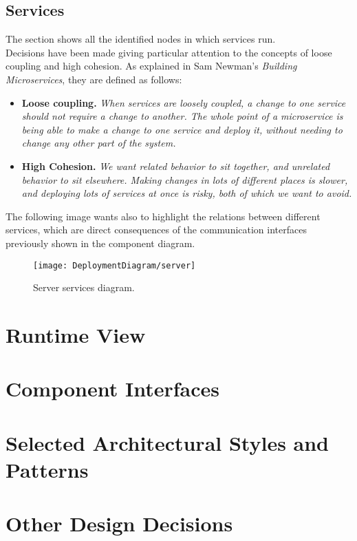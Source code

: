 \subsection{Services}
\label{subsec:services}%
The section shows all the identified nodes in which services run. \\
Decisions have been made giving particular attention to the concepts of loose coupling and high cohesion.
As explained in Sam Newman's \textit{Building Microservices}, they are defined as follows:
\begin{itemize}
    \item \textbf{Loose coupling.} \textit{When services are loosely coupled, a change to one service should not require a change to another.
    The whole point of a microservice is being able to make a change to one service  and deploy it,
        without needing to change any other part of the system.}
    \item \textbf{High Cohesion.} \textit{We want related behavior to sit together, and unrelated behavior to sit elsewhere.
    Making changes in lots of different places is slower, and deploying lots of services at once is risky, both of which we want to avoid.}
\end{itemize}
The following image wants also to highlight the relations between different services, which are direct consequences of the
communication interfaces previously shown in the component diagram.
\begin{figure} [H]
    \begin{center}
        \texttt{[image: DeploymentDiagram/server]}
        \caption{Server services diagram.}
        \label{fig: services}
    \end{center}
\end{figure}



\section{Runtime View}
\label{sec: runtime_view}%


\section{Component Interfaces}
\label{sec: component_interfaces}%


\section{Selected Architectural Styles and Patterns}
\label{sec: patterns}%


\section{Other Design Decisions}
\label{sec: other_design_decisions}%

